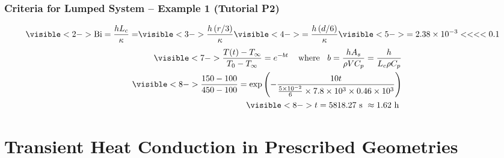 \documentclass[10pt,compress,unknownkeysallowed]{beamer}
\begin{document}
\begin{frame} %
 \frametitle{Criteria for Lumped System --  Example 1 (Tutorial P2)}

       \begin{displaymath}
          \visible<2->{ \Bi = \frc{hL_{c}}{\kappa}= }\visible<3->{\frc{h\left(r/3\right)}{\kappa}} \visible<4->{=\frc{h\left(d/6\right)}{\kappa}} \visible<5->{= 2.38\times 10^{-3} <<<< 0.1}
       \end{displaymath}
       \begin{eqnarray}
           && \visible<7->{\frc{T(t)-T_{\infty}}{T_{0}-T_{\infty}} = e^{-bt} \;\;\;\text{ where }\;\; b = \frc{hA_{s}}{\rho V C_{p}} = \frc{h}{L_{c}\rho C_{p}}} \nonumber \\
           && \visible<8->{\frc{150-100}{450-100} = \exp{\left(-\frc{10 t}{\frac{5\times 10^{-2}}{6}\times 7.8\times 10^{3}\times 0.46\times 10^{3}}\right)}} \nonumber \\
           && \visible<8->{t = 5818.27\text{ s } \approx 1.62\text{ h }} \nonumber 
       \end{eqnarray}
       

\end{frame}

\section{Transient Heat Conduction in Prescribed Geometries}
\end{document}
